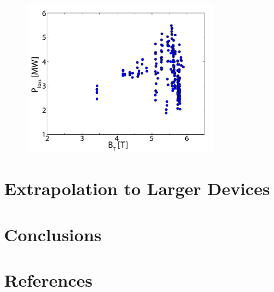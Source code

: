 \documentclass[12pt]{iopart}
\begin{document}
\begin{figure}[ht]
 \centering
 \includegraphics[width=0.75\textwidth]{Bt_Ploss.pdf}
 \caption{}
 \label{fig:Bt_Ploss}
\end{figure}

\section{Extrapolation to Larger Devices}\label{sec:extrap}

\section{Conclusions}\label{sec:conclusion}

\section*{References}


\end{document}
